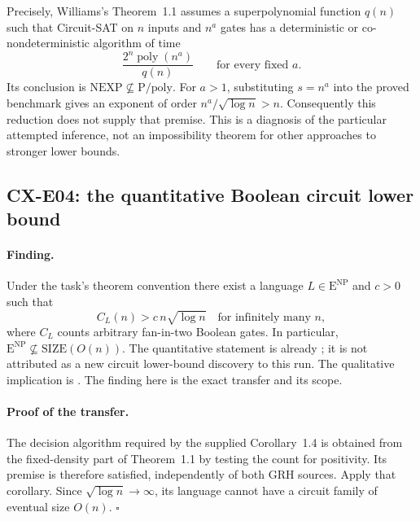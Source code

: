 \documentclass[11pt,a4paper]{article}
\begin{document}
Precisely, Williams's Theorem~1.1 assumes a superpolynomial function
\(q(n)\) such that Circuit-SAT on \(n\) inputs and \(n^a\) gates
has a deterministic or co-nondeterministic algorithm of time
\[
 \frac{2^n\operatorname{poly}(n^a)}{q(n)}
 \qquad\text{for every fixed }a.
\]
Its conclusion is \(\mathrm{NEXP}\not\subseteq\mathrm{P/poly}\).
For \(a>1\), substituting \(s=n^a\) into the proved benchmark gives an
exponent of order \(n^a/\sqrt{\log n}>n\).
Consequently this reduction does not supply that premise.
This is a diagnosis of the particular attempted inference, not an
impossibility theorem for other approaches to stronger lower bounds.

\subsection{CX-E04: the quantitative Boolean circuit lower bound}
\label{finding:CX-E04}

\paragraph{Finding.}
Under the task's theorem convention there exist a language
\(L\in\mathrm E^{\mathrm{NP}}\) and \(c>0\) such that
\[
 C_L(n)>c\,n\sqrt{\log n}
 \quad\text{for infinitely many }n,
\]
where \(C_L\) counts arbitrary fan-in-two Boolean gates.
In particular,
\(\mathrm E^{\mathrm{NP}}\not\subseteq\mathrm{SIZE}(O(n))\).
The quantitative statement is already
\cite[Corollary~1.4]{OpenAIETH}; it is not attributed as a new
circuit lower-bound discovery to this run.
The qualitative implication is
\cite[Theorem~6.1]{Williams2013}.
The finding here is the exact transfer and its scope.

\paragraph{Proof of the transfer.}
The decision algorithm required by the supplied Corollary~1.4 is
obtained from the fixed-density part of Theorem~1.1 by testing the
count for positivity.
Its premise is therefore satisfied, independently of both GRH
sources. Apply that corollary.
Since \(\sqrt{\log n}\longrightarrow\infty\), its language cannot
have a circuit family of eventual size \(O(n)\).
\hfill\(\square\)
\end{document}
